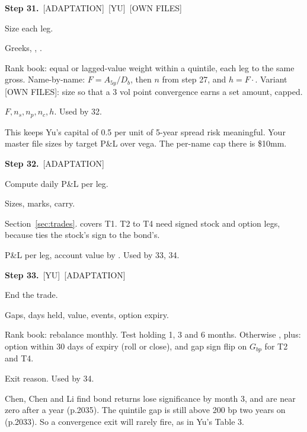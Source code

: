 \documentclass[10pt,a4paper]{article}
\newcommand{\YU}{\textsf{\footnotesize\textcolor{tagother}{[YU]}}}
\newcommand{\OWN}{\textsf{\footnotesize\textcolor{tagother}{[OWN FILES]}}}
\newcommand{\ADAPT}{\textsf{\footnotesize\textcolor{tagadapt}{[ADAPTATION]}}}
\newenvironment{step}[3]{%
  \par\needspace{5\baselineskip}\medskip\noindent\textbf{Step #1.}\ \fn{#2}\hfill#3\par\nopagebreak\small
  \begin{description}[style=sameline,leftmargin=1.7cm,labelwidth=1.5cm,labelsep=0.2cm,itemsep=1pt,parsep=0pt,topsep=1pt,font=\small\bfseries]
}{\end{description}\normalsize}
\newcommand{\Gbp}{G_{bp}}
\begin{document}
\begin{step}{31}{size_trade}{\ADAPT\ \YU\ \OWN}
\item[Purpose] Size each leg.
\item[Inputs] Greeks, , .
\item[Formula] Rank book: equal or lagged-value weight within a quintile, each leg to the same gross. Name-by-name: $F=A_{5y}/D_b$, then $n$ from step 27, and $h=F\cdot$. Variant \OWN: size so that a 3 vol point convergence earns a set amount, capped.
\item[Outputs] $F,n_s,n_p,n_c,h$. Used by 32.
\item[Why] This keeps Yu's capital of 0.5 per unit of 5-year spread risk meaningful. Your master file sizes by target P\&L over vega. The per-name cap there is \$10mm.
\end{step}

\begin{step}{32}{leg_pnl}{\ADAPT}
\item[Purpose] Compute daily P\&L per leg.
\item[Inputs] Sizes, marks, carry.
\item[Formula] Section~\ref{sec:trades}.  covers T1. T2 to T4 need signed stock and option legs, because  ties the stock's sign to the bond's.
\item[Outputs] P\&L per leg, account value by . Used by 33, 34.
\end{step}

\begin{step}{33}{exit_rule}{\YU\ \ADAPT}
\item[Purpose] End the trade.
\item[Inputs] Gaps, days held, value, events, option expiry.
\item[Formula] Rank book: rebalance monthly. Test holding 1, 3 and 6 months. Otherwise , plus: option within 30 days of expiry (roll or close), and gap sign flip on $\Gbp$ for T2 and T4.
\item[Outputs] Exit reason. Used by 34.
\item[Why] Chen, Chen and Li find bond returns lose significance by month 3, and are near zero after a year (p.2035). The quintile gap is still above 200 bp two years on (p.2033). So a convergence exit will rarely fire, as in Yu's Table 3.
\end{step}
\end{document}
